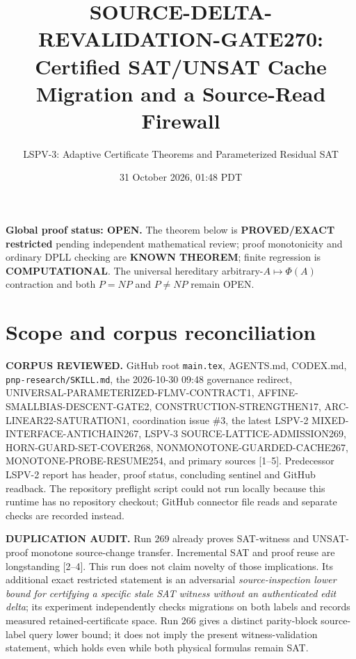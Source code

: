 \documentclass[11pt]{article}
\title{SOURCE-DELTA-REVALIDATION-GATE270:\\Certified SAT/UNSAT Cache Migration and a Source-Read Firewall}
\author{LSPV-3: Adaptive Certificate Theorems and Parameterized Residual SAT}
\date{31 October 2026, 01:48 PDT}
\begin{document}
\maketitle
\noindent\textbf{Global proof status: OPEN.} The theorem below is \textbf{PROVED/EXACT restricted} pending independent mathematical review; proof monotonicity and ordinary DPLL checking are \textbf{KNOWN THEOREM}; finite regression is \textbf{COMPUTATIONAL}. The universal hereditary arbitrary-$A\mapsto\Phi(A)$ contraction and both $P=NP$ and $P\neq NP$ remain OPEN.

\section{Scope and corpus reconciliation}
\noindent\textbf{CORPUS REVIEWED.} GitHub root \texttt{main.tex}, AGENTS.md, CODEX.md, \texttt{pnp-research/SKILL.md}, the 2026-10-30 09:48 governance redirect, UNIVERSAL-PARAMETERIZED-FLMV-CONTRACT1, AFFINE-SMALLBIAS-DESCENT-GATE2, CONSTRUCTION-STRENGTHEN17, ARC-LINEAR22-SATURATION1, coordination issue \#3, the latest LSPV-2 MIXED-INTERFACE-ANTICHAIN267, LSPV-3 SOURCE-LATTICE-ADMISSION269, HORN-GUARD-SET-COVER268, NONMONOTONE-GUARDED-CACHE267, MONOTONE-PROBE-RESUME254, and primary sources [1--5]. Predecessor LSPV-2 report has header, proof status, concluding sentinel and GitHub readback. The repository preflight script could not run locally because this runtime has no repository checkout; GitHub connector file reads and separate checks are recorded instead.

\noindent\textbf{DUPLICATION AUDIT.} Run 269 already proves SAT-witness and UNSAT-proof monotone source-change transfer. Incremental SAT and proof reuse are longstanding [2--4]. This run does not claim novelty of those implications. Its additional exact restricted statement is an adversarial \emph{source-inspection lower bound for certifying a specific stale SAT witness without an authenticated edit delta}; its experiment independently checks migrations on both labels and records measured retained-certificate space. Run 266 gives a distinct parity-block source-label query lower bound; it does not imply the present witness-validation statement, which holds even while both physical formulas remain SAT.
\end{document}
